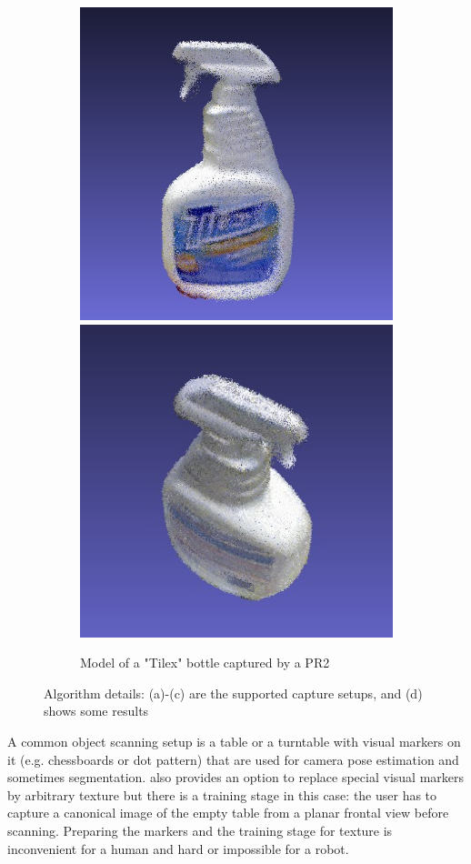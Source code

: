 \documentclass[letterpaper, 10 pt, conference]{ieeeconf}  %
\begin{document}
\begin{figure}[t]
        \begin{subfigure}[b]{\linewidth}
                \centering
                \includegraphics[width=0.49\linewidth]{../tizer/tilexFrontal.jpg}
                \includegraphics[width=0.49\linewidth]{../tizer/tilexTop.jpg}
                \caption{Model of a "Tilex" bottle captured by a PR2}
        \end{subfigure}
        \caption{Algorithm details: (a)-(c) are the supported 
        capture setups, and (d) shows some results}
        \label{fig:tizer}
\end{figure}


A common object scanning setup is a table or a turntable with
visual markers on it (e.g. chessboards or dot pattern) that
are used for camera pose estimation and sometimes segmentation.
\cite{ectoObjectRecognitionCapture} also 
provides an option to replace special visual markers by arbitrary texture but
there is a training stage in this case:
the user has to capture a canonical image of the empty table from
a planar frontal view before scanning. Preparing the markers
and the training stage for texture is inconvenient for a human and
hard or impossible for a robot. 
\end{document}

